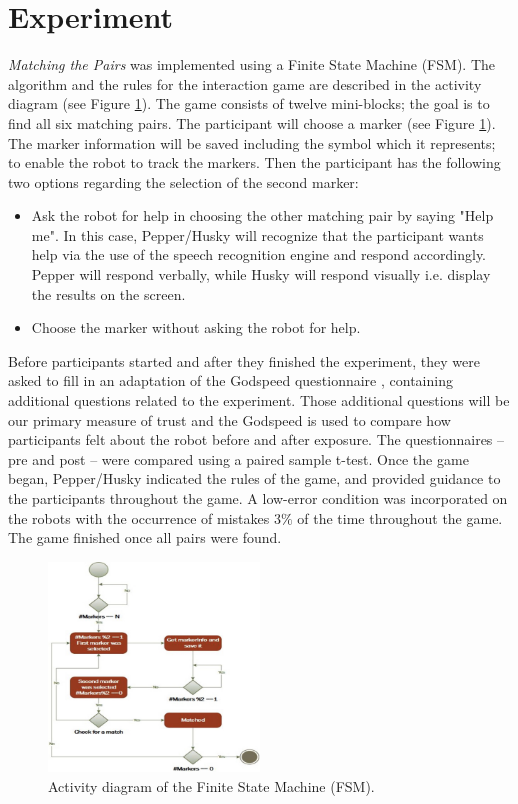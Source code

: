 \documentclass[letterpaper]{article} %
\begin{document}
\section{Experiment}
\textit{Matching the Pairs} was implemented using a Finite State Machine (FSM). The algorithm and the rules for the interaction game are described in the activity diagram (see Figure \ref{pic1}). The game consists of twelve mini-blocks; the goal is to find all six matching pairs. The participant will choose a marker (see Figure \ref{pic1}). The marker information will be saved including the symbol which it represents; to enable the robot to track the markers. Then the participant has the following two options regarding the selection of the second marker:
\begin{itemize}
\item	Ask the robot for help in choosing the other matching pair by saying "Help me". In this case, Pepper/Husky will recognize that the participant wants help via the use of the speech recognition engine and respond accordingly. Pepper will respond verbally, while Husky will respond visually i.e. display the results on the screen.
\item Choose the marker without asking the robot for help.
\end{itemize}
Before participants started and after they finished the experiment, they were asked to fill in an adaptation of the Godspeed questionnaire \cite{bartneck2009measurement}, containing additional questions related to the experiment. Those additional questions will be our primary measure of trust and the Godspeed is used to compare how participants felt about the robot before and after exposure. The questionnaires -- pre and post -- were compared using a paired sample t-test. Once the game began, Pepper/Husky indicated the rules of the game, and provided guidance to the participants throughout the game. A low-error condition was incorporated on the robots with the occurrence of mistakes $3\%$ of the time throughout the game. The game finished once all pairs were found.
\begin{figure}
        \includegraphics[width=0.5\textwidth]{Picture1.jpeg}
        \caption{Activity diagram of the Finite State Machine (FSM).}
        \label{pic1}
\end{figure}
\end{document}
